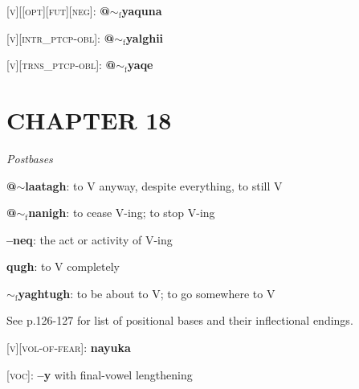 \documentclass{article}
\begin{document}
\textsc{[v][[opt][fut][neg]}: \textbf{@$\sim_\text{f}$yaquna}

\bigskip

\textsc{[v][intr\_ptcp-obl]}: \textbf{@$\sim_\text{f}$yalghii}

\textsc{[v][trns\_ptcp-obl]}: \textbf{@$\sim_\text{f}$yaqe}


\section{CHAPTER 18}

\textit{Postbases}
\begin{description}
\item \textbf{@$\sim$laatagh}: to V anyway, despite everything, to still V
\item \textbf{@$\sim_\text{f}$nanigh}: to cease V-ing; to stop V-ing
\item \textbf{--neq}: the act or activity of V-ing
\item \textbf{qugh}: to V completely
\item \textbf{$\sim_\text{f}$yaghtugh}: to be about to V; to go somewhere to V
\end{description}

\bigskip

See p.126-127 for list of positional bases and their inflectional endings.

\bigskip

\textsc{[v][vol-of-fear]}: \textbf{nayuka}

\bigskip

\textsc{[voc]}: \textbf{--y} with final-vowel lengthening
\end{document}
